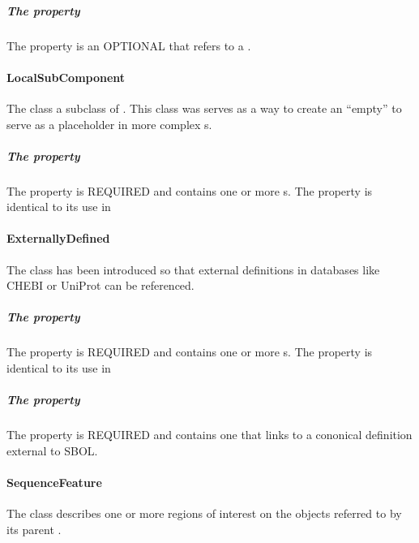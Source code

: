 \subparagraph{The  property}\label{sec:feature:CR}

The  property is an OPTIONAL  that refers to a .

\paragraph{LocalSubComponent}
\label{sec:LocalSubComponent}

The  class a subclass of . This class was serves as a way to create an ``empty''  to serve as a placeholder in more complex s. 

\subparagraph{The  property}\label{sec:type:ER}

The  property is REQUIRED and contains one or more s. The  property is identical to its use in 

\paragraph{ExternallyDefined}
\label{sec:ExternallyDefined}

The  class has been introduced so that external definitions in databases like CHEBI or UniProt can be referenced.

\subparagraph{The  property}\label{sec:type:ER}

The  property is REQUIRED and contains one or more s. The  property is identical to its use in 

\subparagraph{The  property}\label{sec:definition:ER}

The  property is REQUIRED and contains one  that links to a cononical definition external to SBOL.


\paragraph{SequenceFeature}
\label{sec:SequenceFeature}

The  class describes one or more regions of interest on the  objects referred to by its parent . 

